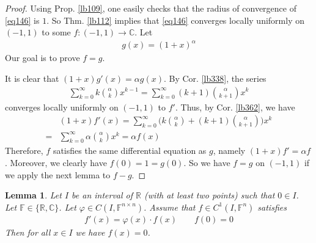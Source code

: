 \documentclass[12pt,b5paper,notitlepage]{article}
\theoremstyle{definition}
\theoremstyle{plain}
\newtheorem{lm}[df]{Lemma}
\newcommand{\Cbb}{\mathbb C}
\newcommand{\Rbb}{\mathbb R}
\newcommand{\Fbb}{\mathbb F}
\numberwithin{equation}{section}
\begin{document}
\begin{proof}
Using Prop. \ref{lb109}, one easily checks that the radius of convergence of \eqref{eq146} is $1$. So Thm. \ref{lb112} implies that \eqref{eq146} converges locally uniformly on $(-1,1)$ to some $f:(-1,1)\rightarrow\Cbb$. Let
\begin{align*}
g(x)=(1+x)^\alpha
\end{align*}
Our goal is to prove $f=g$. 

It is clear that $(1+x)g'(x)=\alpha g(x)$. By Cor. \ref{lb338},  the series
\begin{align}
\sum_{k=0}^\infty k{\alpha\choose k}x^{k-1}=\sum_{k=0}^\infty (k+1){\alpha\choose k+1}x^k
\end{align}
converges locally uniformly on $(-1,1)$ to $f'$. Thus, by Cor. \ref{lb362}, we have
\begin{align*}
&(1+x)f'(x)=\sum_{k=0}^\infty \bigg( k{\alpha\choose k}+(k+1){\alpha\choose k+1}\bigg)x^k\\
=&\sum_{k=0}^\infty \alpha{\alpha\choose k}x^k=\alpha f(x)
\end{align*}
Therefore, $f$ satisfies the same differential equation as $g$, namely $(1+x)f'=\alpha f$. Moreover, we clearly have $f(0)=1=g(0)$. So we have $f=g$ on $(-1,1)$ if we apply the next lemma to $f-g$.
\end{proof}


\begin{lm}
Let $I$ be an interval of $\Rbb$ (with at least two points) such that $0\in I$. Let $\Fbb\in\{\Rbb,\Cbb\}$. Let $\varphi\in C(I,\Fbb^{n\times n})$. Assume that $f\in C^1(I,\Fbb^n)$ satisfies
\begin{align}
f'(x)=\varphi(x)\cdot f(x)\qquad f(0)=0
\end{align} 
Then for all $x\in I$ we have $f(x)=0$.
\end{lm}
\end{document}
